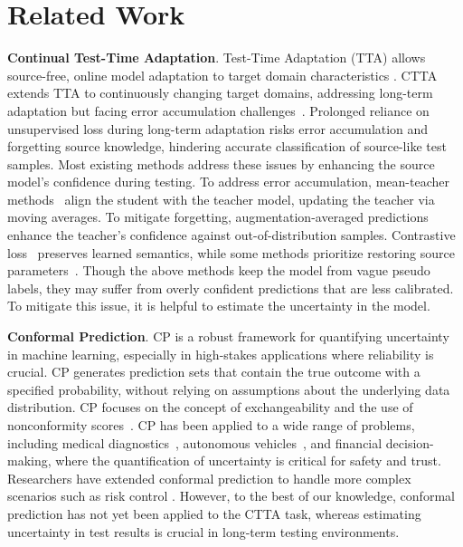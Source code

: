 \section{Related Work}
\textbf{Continual Test-Time Adaptation}.
Test-Time Adaptation (TTA) allows source-free, online model adaptation to target domain characteristics \cite{jain2011online,sun2020test,wang2020tent}. CTTA~\cite{wang2022continual,lyu2024variational,tan2024less} extends TTA to continuously changing target domains, addressing long-term adaptation but facing error accumulation challenges~\cite{tarvainen2017mean,wang2022continual}. 
Prolonged reliance on unsupervised loss during long-term adaptation risks error accumulation and forgetting source knowledge, hindering accurate classification of source-like test samples. Most existing methods address these issues by enhancing the source model's confidence during testing.
To address error accumulation, mean-teacher methods~\cite{tarvainen2017mean} align the student with the teacher model, updating the teacher via moving averages. To mitigate forgetting, augmentation-averaged predictions~\cite{wang2022continual,brahma2023probabilistic,dobler2023robust,yang2023exploring} enhance the teacher's confidence against out-of-distribution samples. 
Contrastive loss~\cite{dobler2023robust,chakrabarty2023sata} preserves learned semantics, while some methods prioritize restoring source parameters~\cite{wang2022continual,brahma2023probabilistic}.
Though the above methods keep the model from vague pseudo labels, they may suffer from overly confident predictions that are less calibrated.
To mitigate this issue, it is helpful to estimate the uncertainty in the model.

\noindent
\textbf{Conformal Prediction}.
CP is a robust framework for quantifying uncertainty in machine learning, especially in high-stakes applications where reliability is crucial. 
CP generates prediction sets that contain the true outcome with a specified probability, without relying on assumptions about the underlying data distribution. CP focuses on the concept of exchangeability and the use of nonconformity scores~\cite{vovk2005algorithmic}.
CP has been applied to a wide range of problems, including medical diagnostics~\cite{caruana2015intelligible}, autonomous vehicles~\cite{lekeufack2023conformal}, and financial decision-making, where the quantification of uncertainty is critical for safety and trust.
Researchers have extended conformal prediction to handle more complex scenarios such as risk control \cite{farinhas2023non}.
However, to the best of our knowledge, conformal prediction has not yet been applied to the CTTA task, whereas estimating uncertainty in test results is crucial in long-term testing environments.